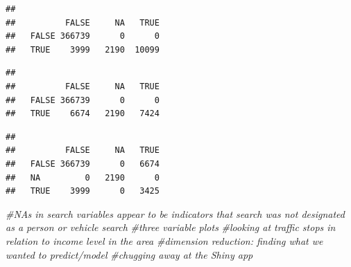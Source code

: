 \documentclass[
]{book}
\newenvironment{Shaded}{\begin{snugshade}}{\end{snugshade}}
\newcommand{\CommentTok}[1]{\textcolor[rgb]{0.56,0.35,0.01}{\textit{#1}}}
\newcommand{\KeywordTok}[1]{\textcolor[rgb]{0.13,0.29,0.53}{\textbf{#1}}}
\newcommand{\NormalTok}[1]{#1}
\newcommand{\OperatorTok}[1]{\textcolor[rgb]{0.81,0.36,0.00}{\textbf{#1}}}
\begin{document}
\begin{Shaded}
\end{Shaded}

\begin{verbatim}
##        
##          FALSE     NA   TRUE
##   FALSE 366739      0      0
##   TRUE    3999   2190  10099
\end{verbatim}

\begin{Shaded}
\end{Shaded}

\begin{verbatim}
##        
##          FALSE     NA   TRUE
##   FALSE 366739      0      0
##   TRUE    6674   2190   7424
\end{verbatim}

\begin{Shaded}
\end{Shaded}

\begin{verbatim}
##        
##          FALSE     NA   TRUE
##   FALSE 366739      0   6674
##   NA         0   2190      0
##   TRUE    3999      0   3425
\end{verbatim}

\begin{Shaded}
\begin{Highlighting}[]
\CommentTok{#NAs in search variables appear to be indicators that search was not designated as a person or vehicle search}
\CommentTok{#three variable plots}
\CommentTok{#looking at traffic stops in relation to income level in the area}
\CommentTok{#dimension reduction: finding what we wanted to predict/model}
\CommentTok{#chugging away at the Shiny app}
\end{Highlighting}
\end{Shaded}
\end{document}

